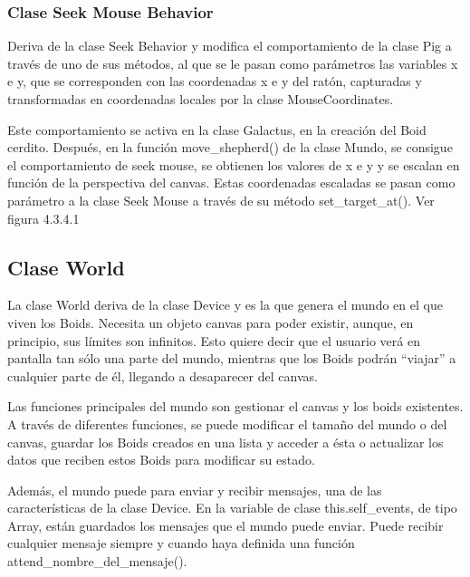 \subsubsection{Clase Seek Mouse Behavior}
\label{subsubsection:seek_mouse_behavior}

Deriva de la clase Seek Behavior y modifica el comportamiento de la clase Pig a través de uno de sus métodos, al que se le pasan 
como parámetros las variables x e y, que se corresponden  con las coordenadas x e y del ratón, capturadas y transformadas en coordenadas 
locales por la clase MouseCoordinates.

Este comportamiento se activa en la clase Galactus, en la creación del Boid cerdito. Después, en la función move\_shepherd() de la clase 
Mundo, se consigue el comportamiento de seek mouse, se obtienen los valores de x e y y se escalan en función de la perspectiva del canvas.
Estas coordenadas escaladas se pasan como parámetro a la clase Seek Mouse a través de su método  set\_target\_at(). Ver figura 4.3.4.1\\





\subsection{Clase World}
\label{subsection:world}

La clase World deriva de la clase Device y es la que genera el mundo en el que viven los Boids. Necesita un objeto canvas para poder 
existir, aunque, en principio, sus límites son infinitos. Esto quiere decir que el usuario verá en pantalla tan sólo una parte del mundo, 
mientras que los Boids podrán “viajar” a cualquier parte de él, llegando a desaparecer del canvas.

Las funciones principales del mundo son gestionar el canvas y los boids existentes. A través de diferentes funciones, se puede modificar 
el tamaño del mundo o del canvas, guardar los Boids creados en una lista y acceder a ésta o actualizar los datos que reciben estos Boids 
para modificar su estado.

Además, el mundo puede para enviar y recibir mensajes, una de las características de la clase Device. En la variable de clase 
this.self\_events, de tipo Array, están guardados los mensajes que el mundo puede enviar. Puede recibir cualquier mensaje siempre y cuando
haya definida una función attend\_nombre\_del\_mensaje().\\

